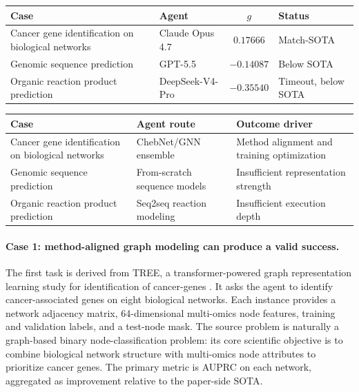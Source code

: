 \begin{center}
\begin{minipage}{\textwidth}
\label{tab:app-case-overview}
\centering
\small
\setlength{\tabcolsep}{6pt}
\begin{tabular}{@{}>{\raggedright\arraybackslash}p{} l c l@{}}
\toprule
Case & Agent & $g$ & Status \\
\midrule
Cancer gene identification on biological networks & Claude Opus 4.7 & $0.17666$ & Match-SOTA \\
Genomic sequence prediction & GPT-5.5 & $-0.14087$ & Below SOTA \\
Organic reaction product prediction & DeepSeek-V4-Pro & $-0.35540$ & Timeout, below SOTA \\
\bottomrule
\end{tabular}
\end{minipage}
\end{center}

\begin{center}
\begin{minipage}{\textwidth}
\label{tab:app-case-mechanisms}
\centering
\small
\setlength{\tabcolsep}{6pt}
\begin{tabular}{@{}>{\raggedright\arraybackslash}p{} >{\raggedright\arraybackslash}p{} >{\raggedright\arraybackslash}p{}@{}}
\toprule
Case & Agent route & Outcome driver \\
\midrule
Cancer gene identification on biological networks & ChebNet/GNN ensemble & Method alignment and training optimization \\
Genomic sequence prediction & From-scratch sequence models & Insufficient representation strength \\
Organic reaction product prediction & Seq2seq reaction modeling & Insufficient execution depth \\
\bottomrule
\end{tabular}
\end{minipage}
\end{center}

\paragraph{Case 1: method-aligned graph modeling can produce a valid success.}
The first task is derived from TREE, a transformer-powered graph representation learning study for identification of cancer-genes \citep{su2025tree}. It asks the agent to identify cancer-associated genes on eight biological networks. Each instance provides a network adjacency matrix, 64-dimensional multi-omics node features, training and validation labels, and a test-node mask. The source problem is naturally a graph-based binary node-classification problem: its core scientific objective is to combine biological network structure with multi-omics node attributes to prioritize cancer genes. The primary metric is AUPRC on each network, aggregated as improvement relative to the paper-side SOTA.

